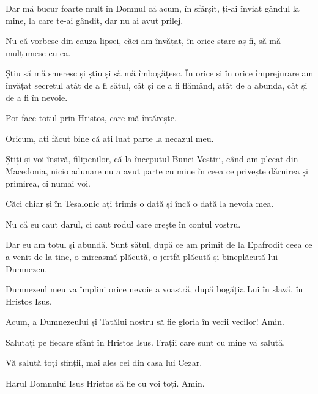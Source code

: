 {\par }{\PP {}Dar mă bucur foarte mult în Domnul că acum, în sfârșit, ți-ai înviat gândul la mine, la care te-ai gândit, dar nu ai avut prilej.

Nu că vorbesc din cauza lipsei, căci am învățat, în orice stare aș fi, să mă mulțumesc cu ea.

Știu să mă smeresc și știu și să mă îmbogățesc. În orice și în orice împrejurare am învățat secretul atât de a fi sătul, cât și de a fi flămând, atât de a abunda, cât și de a fi în nevoie.

Pot face totul prin Hristos, care mă întărește.

Oricum, ați făcut bine că ați luat parte la necazul meu.

Știți și voi înșivă, filipenilor, că la începutul Bunei Vestiri, când am plecat din Macedonia, nicio adunare nu a avut parte cu mine în ceea ce privește dăruirea și primirea, ci numai voi.

Căci chiar și în Tesalonic ați trimis o dată și încă o dată la nevoia mea.

Nu că eu caut darul, ci caut rodul care crește în contul vostru.

Dar eu am totul și abundă. Sunt sătul, după ce am primit de la Epafrodit ceea ce a venit de la tine, o mireasmă plăcută, o jertfă plăcută și bineplăcută lui Dumnezeu.

Dumnezeul meu va împlini orice nevoie a voastră, după bogăția Lui în slavă, în Hristos Isus.

Acum, a Dumnezeului și Tatălui nostru să fie gloria în vecii vecilor! Amin.


\par }{\PP {}Salutați pe fiecare sfânt în Hristos Isus. Frații care sunt cu mine vă salută.

Vă salută toți sfinții, mai ales cei din casa lui Cezar.


\par }{\PP {}Harul Domnului Isus Hristos să fie cu voi toți. Amin.


\par }